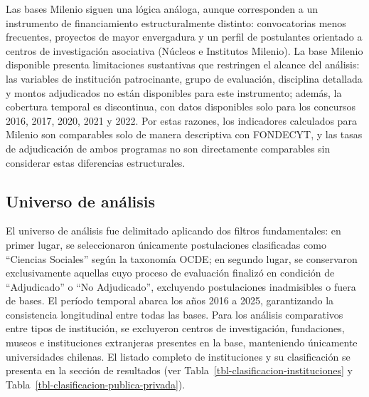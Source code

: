 \documentclass[
  spanish,
  a4paper,
  oneside]{scrbook}
\begin{document}
Las bases Milenio siguen una lógica análoga, aunque corresponden a un
instrumento de financiamiento estructuralmente distinto: convocatorias
menos frecuentes, proyectos de mayor envergadura y un perfil de
postulantes orientado a centros de investigación asociativa (Núcleos e
Institutos Milenio). La base Milenio disponible presenta limitaciones
sustantivas que restringen el alcance del análisis: las variables de
institución patrocinante, grupo de evaluación, disciplina detallada y
montos adjudicados no están disponibles para este instrumento; además,
la cobertura temporal es discontinua, con datos disponibles solo para
los concursos 2016, 2017, 2020, 2021 y 2022. Por estas razones, los
indicadores calculados para Milenio son comparables solo de manera
descriptiva con FONDECYT, y las tasas de adjudicación de ambos programas
no son directamente comparables sin considerar estas diferencias
estructurales.

\subsection{Universo de análisis}\label{universo-de-anuxe1lisis}

El universo de análisis fue delimitado aplicando dos filtros
fundamentales: en primer lugar, se seleccionaron únicamente
postulaciones clasificadas como ``Ciencias Sociales'' según la taxonomía
OCDE; en segundo lugar, se conservaron exclusivamente aquellas cuyo
proceso de evaluación finalizó en condición de ``Adjudicado'' o ``No
Adjudicado'', excluyendo postulaciones inadmisibles o fuera de bases. El
período temporal abarca los años 2016 a 2025, garantizando la
consistencia longitudinal entre todas las bases. Para los análisis
comparativos entre tipos de institución, se excluyeron centros de
investigación, fundaciones, museos e instituciones extranjeras presentes
en la base, manteniendo únicamente universidades chilenas. El listado
completo de instituciones y su clasificación se presenta en la sección
de resultados (ver Tabla~\ref{tbl-clasificacion-instituciones} y
Tabla~\ref{tbl-clasificacion-publica-privada}).
\end{document}
